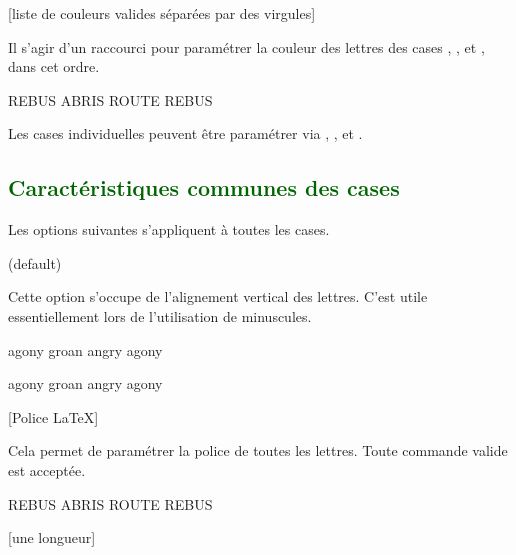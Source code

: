 \documentclass[svgnames]{report}
\newcommand\Section[1]{\subsection{\textcolor{DarkGreen}{#1}}}
\begin{document}
  [liste de couleurs valides séparées par des virgules]

  Il s'agir d'un raccourci pour paramétrer la couleur des lettres des cases   , ,  et , dans cet ordre.

  \begin{example}
  \begin{wordle}[CouleurLettres={red,orange,blue}]{REBUS}
    ABRIS
    ROUTE
    REBUS
  \end{wordle}
  \end{example}

  Les cases individuelles peuvent être paramétrer via , ,  et .


  \Section{Caractéristiques communes des cases}

  Les options suivantes s'appliquent à toutes les cases.

   (default) \qquad

  Cette option s'occupe de l'alignement vertical des lettres. C'est utile essentiellement lors de l'utilisation de minuscules.

  \begin{example}
  \begin{wordle}[align]{agony}
     groan
     angry
     agony
  \end{wordle}
  \end{example}

  \begin{example}
  \begin{wordle}{agony} %
    groan
    angry
    agony
  \end{wordle}
  \end{example}

       [Police \LaTeX]
  
  Cela permet de paramétrer la police de toutes les lettres. Toute commande valide est acceptée.

  \begin{example}
  \begin{wordle}[Police=\large\ttfamily]{REBUS}
    ABRIS
    ROUTE
    REBUS
  \end{wordle}
  \end{example}

  [une longueur]
\end{document}
